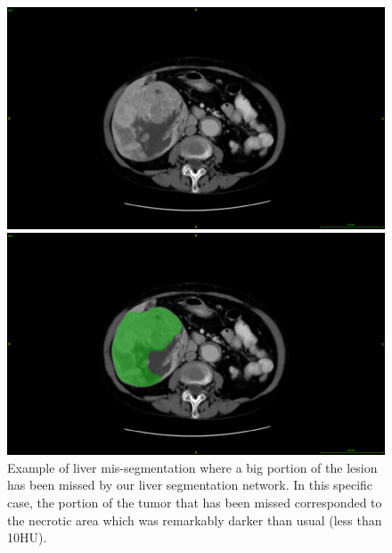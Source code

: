 \documentclass[]{article}
\begin{document}
\begin{figure}[ht!]
	\centering
	\begin{minipage}{0.45\linewidth}
		\includegraphics[width=\linewidth]{../Contributions/images/MisSegmentations/ResizeTCGA-DD-A1EB_slice16_raw}
	\end{minipage} \hspace{-0.1cm}
	\begin{minipage}{0.45\linewidth}
		\includegraphics[width=\linewidth]{../Contributions/images/MisSegmentations/ResizeTCGA-DD-A1EB_slice16_liverPrediction_Cmap}
	\end{minipage}
	\caption{Example of liver mis-segmentation where a big portion of the lesion has been missed by our liver segmentation network. In this specific case, the portion of the tumor that has been missed corresponded to the necrotic area which was remarkably darker than usual (less than 10HU).}
	\label{fig:LITS_networkMisSeg_tumor}
\end{figure}
\end{document}
